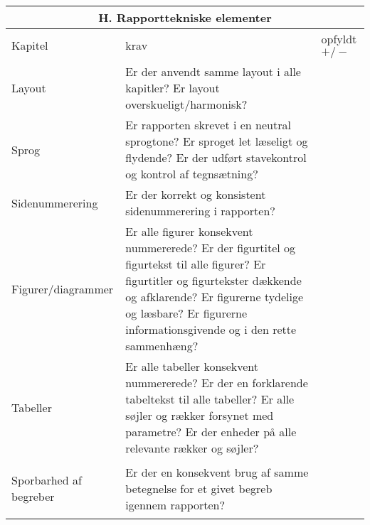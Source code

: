 \begin{center}
\begin{longtable}{|m{3.5cm}|m{10cm}|m{2.5cm}|}
\hline
\multicolumn{3}{|c|}{H. Rapporttekniske elementer} \\ \hline
Kapitel & krav & opfyldt $+/-$ \\ \hline
Layout & Er der anvendt samme layout i alle kapitler? \newline
Er layout overskueligt/harmonisk? & \\ \hline
Sprog & Er rapporten skrevet i en neutral sprogtone? \newline
Er sproget let læseligt og flydende? \newline
Er der udført stavekontrol og kontrol af tegnsætning? & \\ \hline
Sidenummerering & Er der korrekt og konsistent sidenummerering i rapporten? & \\ 
\hline
Figurer/diagrammer & Er alle figurer konsekvent nummererede? \newline
Er der figurtitel og figurtekst til alle figurer? \newline
Er figurtitler og figurtekster dækkende og afklarende? \newline
Er figurerne tydelige og læsbare? \newline
Er figurerne informationsgivende og i den rette sammenhæng?
& \\ \hline
Tabeller & 
Er alle tabeller konsekvent nummererede? \newline
Er der en forklarende tabeltekst til alle tabeller? \newline
Er alle søjler og rækker forsynet med parametre? \newline
Er der enheder på alle relevante rækker og søjler? 
& \\ \hline
\begin{flushleft} 
Sporbarhed af begreber 
\end{flushleft}
& Er der en konsekvent brug af samme betegnelse for et givet begreb igennem rapporten? & \\ \hline




\end{longtable}
\end{center}